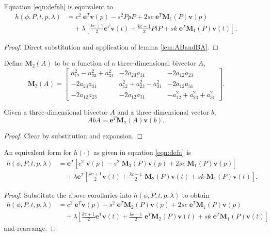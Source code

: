 \begin{cor}
Equation \ref{eqn:defnh} is equivalent to
\begin{align*}
h(\phi, P, t, p, \lambda) &= c^2\;\mathbf{e}^T\mathbf{v}(p) - s^2PpP + 2sc\;\mathbf{e}^T\mathbf{M}_1(P)\mathbf{v}(p) \\
&\quad+ \lambda\left[ 
 \frac{kc+1}{2} \mathbf{e}^T\mathbf{v}(t) + \frac{kc-1}{2} PtP
+ sk\;\mathbf{e}^T\mathbf{M}_1(P)\mathbf{v}(t)
\right].
\end{align*}
\begin{proof}
Direct substitution and application of lemma \ref{lem:ABandBA}.
\end{proof}
\end{cor}

\begin{definition}
Define $\mathbf{M}_2(A)$ to be a function of a three-dimensional bivector $A$,
\[
\mathbf{M}_2(A)  =
\left[
\begin{array}{ccc}
a^2_{12} - a^2_{23} + a^2_{31} &  - 2a_{23}a_{31} & - 2a_{12}a_{23} \\
- 2a_{23}a_{31} & a^2_{12} + a^2_{23} - a^2_{31} & - 2a_{12}a_{31}  \\
- 2a_{12}a_{23} & - 2a_{12}a_{31} &  -a^2_{12} + a^2_{23} + a^2_{31} 
\end{array}
\right].
\]
\end{definition}

\begin{cor}
Given a three-dimensional bivector $A$ and a three-dimensional vector $b$,
\[
AbA = \mathbf{e}^T \mathbf{M}_2(A) \mathbf{v}(b).
\]
\begin{proof}
Clear by substitution and expansion.
\end{proof}
\end{cor}

\begin{lemma}
\label{lem:finalh}
An equivalent form for $h(\cdot)$ as given in equation \ref{eqn:defn} is
\begin{align*}
h(\phi, P, t, p, \lambda) &= 
\mathbf{e}^T \left[ 
 c^2\;\mathbf{v}(p) - s^2\;\mathbf{M}_2(P)\mathbf{v}(p) + 2sc\;\mathbf{M}_1(P)\mathbf{v}(p) 
\right] \\
&\quad+ \lambda\mathbf{e}^T\left[ 
 \frac{kc+1}{2} \mathbf{v}(t) + \frac{kc-1}{2} \;\mathbf{M}_2(P)\mathbf{v}(t)
+ sk\;\mathbf{M}_1(P)\mathbf{v}(t)
 \right].
\end{align*}
\begin{proof}
Substitute the above corollaries into $h(\phi, P, t, p,\lambda)$ to obtain
\begin{align*}
h(\phi, P, t, p, \lambda) &= 
c^2\;\mathbf{e}^T\mathbf{v}(p) - s^2\;\mathbf{e}^T\mathbf{M}_2(P)\mathbf{v}(p) + 2sc\;\mathbf{e}^T\mathbf{M}_1(P)\mathbf{v}(p) \\
&\quad+ \lambda\left[ 
 \frac{kc+1}{2} \mathbf{e}^T\mathbf{v}(t) + \frac{kc-1}{2} \;\mathbf{e}^T\mathbf{M}_2(P)\mathbf{v}(t)
+ sk\;\mathbf{e}^T\mathbf{M}_1(P)\mathbf{v}(t)
 \right]
\end{align*}
and rearrange.
\end{proof}
\end{lemma}

